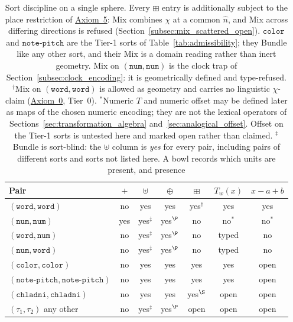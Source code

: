 \documentclass[12pt, a4paper]{article}
\begin{document}
\begin{table}[h]
\centering
\begin{tabular}{lcccccc}
\hline
Pair & $+$ & $\uplus$ & $\oplus$ & $\boxplus$ & $T_w(x)$ & $x-a+b$ \\
\hline
$(\mathtt{word},\mathtt{word})$ & no & yes & yes & yes$^{\dagger}$ & yes & yes \\
$(\mathtt{num},\mathtt{num})$   & yes & yes$^{\ddagger}$ & yes$^{\P}$ & no  & no$^{*}$ & no$^{*}$ \\
$(\mathtt{word},\mathtt{num})$ & no & yes$^{\ddagger}$ & yes$^{\P}$ & no & typed & no \\
$(\mathtt{num},\mathtt{word})$ & no & yes$^{\ddagger}$ & yes$^{\P}$ & no & typed & no \\
$(\mathtt{color},\mathtt{color})$ & no & yes & yes & yes & yes & open \\
$(\mathtt{note\text{-}pitch},\mathtt{note\text{-}pitch})$ & no & yes & yes & yes & yes & open \\
$(\mathtt{chladni},\mathtt{chladni})$ & no & yes & yes & yes$^{\S}$ & open & open \\
$(\tau_1,\tau_2)$ any other & no & yes$^{\ddagger}$ & yes$^{\P}$ & open & open & open \\
\hline
\end{tabular}
\caption{Sort discipline on a single sphere. Every $\boxplus$ entry is
additionally subject to the place restriction of
\hyperref[subsec:axiom_interference]{Axiom~5}: Mix combines $\chi$ at a common
$\hat n$, and Mix across differing directions is refused
(Section~\ref{subsec:mix_scattered_open}).
$\mathtt{color}$ and $\mathtt{note\text{-}pitch}$ are the Tier-1 sorts of
Table~\ref{tab:admissibility}; they Bundle like any other sort, and
their Mix is a domain reading rather than inert geometry.
Mix on $(\mathtt{num},\mathtt{num})$ is the clock trap of
Section~\ref{subsec:clock_encoding}: it is geometrically defined and
type-refused. $^{\dagger}$Mix on $(\mathtt{word},\mathtt{word})$ is
allowed as geometry and carries no linguistic $\chi$-claim
(\hyperref[subsec:axiom0_admissibility]{Axiom~0}, Tier~0).
$^{*}$Numeric $T$ and numeric offset may be defined later as
maps of the chosen numeric encoding; they are not the lexical
operators of Sections~\ref{sec:transformation_algebra}
and~\ref{sec:analogical_offset}. Offset on the Tier-1 sorts is
untested here and marked open rather than claimed.
$^{\ddagger}$Bundle is sort-blind: the $\uplus$ column is \emph{yes}
for every pair, including pairs of different sorts and sorts not
listed here. A bowl records which units are present, and presence
}
\end{table}
\end{document}
